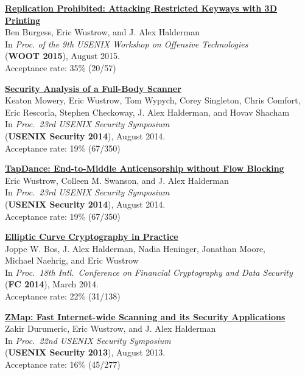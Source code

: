 \documentclass[margin,11pt]{res} %
\begin{document}
    \textbf{\href{https://keysforge.com/}{Replication Prohibited: Attacking Restricted Keyways with 3D Printing}} \\
    Ben Burgess, Eric Wustrow, and J. Alex Halderman \\
    In \emph{Proc. of the 9th USENIX Workshop on Offensive Technologies} \\
    (\textbf{WOOT 2015}), August 2015. \\
    Acceptance rate: 35\% (20/57)

    \textbf{\href{https://www.radsec.org/paper.html}{Security Analysis of a Full-Body Scanner}} \\
    Keaton Mowery, Eric Wustrow, Tom Wypych, Corey Singleton, Chris Comfort, Eric Rescorla, Stephen Checkoway, J. Alex Halderman, and Hovav Shacham \\
    In \emph{Proc.\ 23rd USENIX Security Symposium} \\
    (\textbf{USENIX Security 2014}), August 2014. \\
    Acceptance rate: 19\% (67/350)

    \textbf{\href{https://jhalderm.com/pub/papers/tapdance-sec14.pdf}{TapDance: End-to-Middle Anticensorship without Flow Blocking}} \\
    Eric Wustrow, Colleen M. Swanson, and J. Alex Halderman \\
    In \emph{Proc.\ 23rd USENIX Security Symposium} \\
    (\textbf{USENIX Security 2014}), August 2014. \\
    Acceptance rate: 19\% (67/350)

    \textbf{\href{http://eprint.iacr.org/2013/734}{Elliptic Curve Cryptography in Practice}} \\
    Joppe W. Bos, J. Alex Halderman, Nadia Heninger, Jonathan Moore,\\ Michael Naehrig, and Eric Wustrow \\
    In \emph{Proc.\ 18th Intl.\ Conference on Financial Cryptography and Data Security} \\
    (\textbf{FC 2014}), March 2014. \\
    Acceptance rate: 22\% (31/138)

    \textbf{\href{https://zmap.io/paper.html}{ZMap: Fast Internet-wide Scanning and its Security Applications}} \\
    Zakir Durumeric, Eric Wustrow, and J. Alex Halderman \\
    In \emph{Proc.\ 22nd USENIX Security Symposium} \\
    (\textbf{USENIX Security 2013}), August 2013. \\
    Acceptance rate: 16\% (45/277)
\end{document}
